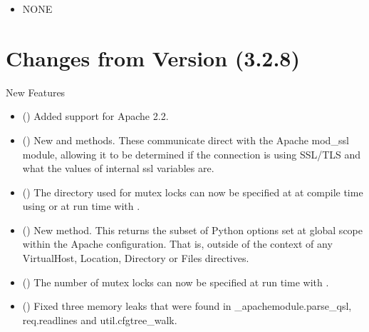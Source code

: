   \begin{itemize}
    \item
      NONE
  \end{itemize}

\chapter{Changes from Version (3.2.8)\label{app-changes}}


  New Features

  \begin{itemize}
    \item
      ()
      Added support for Apache 2.2.
    \item
      ()
      New  and  methods.
      These communicate direct with the Apache mod_ssl module, allowing
      it to be determined if the connection is using SSL/TLS and what the
      values of internal ssl variables are.
    \item
      ()
      The directory used for mutex locks can now be specified at 
      at compile time using 
      or at run time with .
    \item
      ()
      New  method. This returns the subset
      of Python options set at global scope within the Apache configuration.
      That is, outside of the context of any VirtualHost, Location, Directory
      or Files directives.
    \item
      ()
      The number of mutex locks can now be specified at run time with
      .
    \item
     ()
      Fixed three memory leaks that were found in _apachemodule.parse_qsl, req.readlines
      and util.cfgtree_walk.
  \end{itemize}


